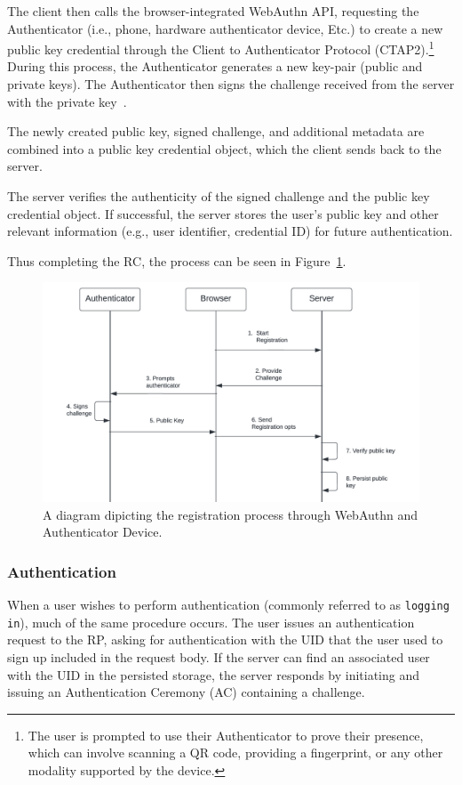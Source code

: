 The client then calls the browser-integrated WebAuthn API, requesting the
Authenticator (i.e., phone, hardware authenticator device, Etc.)
to create a new public key credential through the Client to Authenticator
Protocol (CTAP2).\footnote{
  The user is prompted to use their Authenticator to prove their presence,
  which can involve scanning a QR code, providing a fingerprint, or any other
  modality supported by the device.}
During this process, the Authenticator generates a new key-pair (public and
private keys).
The Authenticator then signs the challenge received from the server with the
private key~\cite{webauthn-2-registering}.

The newly created public key, signed challenge, and additional metadata are
combined into a public key credential object, which the client sends back to
the server.

The server verifies the authenticity of the signed challenge and the public key 
credential object.
If successful, the server stores the user's public key and other relevant 
information (e.g., user identifier, credential ID) for future authentication.

Thus completing the RC, the process can be seen in
Figure~\ref{fig:registration}.
\begin{figure}[htbp]
  \centering
  \includegraphics[width=0.75\linewidth]{images/Registration}
  \caption{\footnotesize A diagram dipicting the registration process through WebAuthn and Authenticator Device.}
  \label{fig:registration}
\end{figure}

\subsubsection{Authentication}\label{subsubsec:authentication}
When a user wishes to perform authentication (commonly referred to as \texttt{logging in}), much of the same procedure
occurs.
The user issues an authentication request to the RP, asking for authentication
with the UID that the user used to sign up included in the request body.
If the server can find an associated user with the UID in the persisted storage,
the server responds by initiating and issuing an Authentication Ceremony (AC)
containing a challenge.


